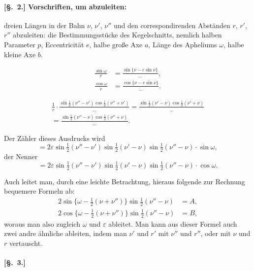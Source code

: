 \documentclass[12pt,a4paper]{article}
\theoremstyle{plain}
\theoremstyle{definition}
\theoremstyle{remark}
\begin{document}
\newpage

\paragraph{[§.~2.] Vorschriften, um abzuleiten:}

dreien Längen in der Bahn $\nu$, $\nu'$, $\nu''$ und den correspondirenden Abständen $r$, $r'$, $r''$ abzuleiten: die Bestimmungsstücke des Kegelschnitts, nemlich halben Parameter $p$, Eccentricität $e$, halbe große Axe $a$, Länge des Apheliums $\omega$, halbe kleine Axe $b$.

\begin{align*}
\frac{\sin\omega}{r} &= \frac{\sin\{\nu - e \sin\nu\}}{\dots}, \\
\frac{\cos\omega}{r} &= \frac{\cos\{\nu - e \sin\nu\}}{\dots}.
\end{align*}

\begin{multline*}
\frac{1}{r} \cdot \frac{\sin\tfrac{1}{2}(\nu'' - \nu') \cos\tfrac{1}{2}(\nu'' + \nu')}{\dots} = \frac{\sin\tfrac{1}{2}(\nu' - \nu) \cos\tfrac{1}{2}(\nu' + \nu)}{\dots} \\
= \frac{\sin\tfrac{1}{2}(\nu'' - \nu) \cos\tfrac{1}{2}(\nu'' + \nu)}{\dots}.
\end{multline*}

Der Zähler dieses Ausdrucks wird
\[= 2\varepsilon \sin\tfrac{1}{2}(\nu'' - \nu') \sin\tfrac{1}{2}(\nu' - \nu) \sin\tfrac{1}{2}(\nu'' - \nu) \cdot \sin\omega,\]
der Nenner
\[= 2\varepsilon \sin\tfrac{1}{2}(\nu'' - \nu') \sin\tfrac{1}{2}(\nu' - \nu) \sin\tfrac{1}{2}(\nu'' - \nu) \cdot \cos\omega.\]

Auch leitet man, durch eine leichte Betrachtung, hieraus folgende zur Rechnung bequemere Formeln ab:
\begin{align*}
2 \sin\{\omega - \tfrac{1}{2}(\nu + \nu'')\} \sin\tfrac{1}{2}(\nu'' - \nu) &= A, \\
2 \cos\{\omega - \tfrac{1}{2}(\nu + \nu'')\} \sin\tfrac{1}{2}(\nu'' - \nu) &= B,
\end{align*}
woraus man also zugleich $\omega$ und $\varepsilon$ ableitet. Man kann aus dieser Formel auch zwei andre ähnliche ableiten, indem man $\nu'$ und $r'$ mit $\nu''$ und $r''$, oder mit $\nu$ und $r$ vertauscht.

\newpage

\paragraph{[§.~3.]}
\end{document}
